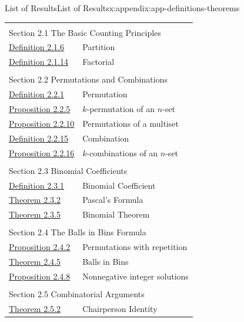 \documentclass[oneside,10pt,]{book}
\numberwithin{equation}{section}
\begin{document}
\begin{appendixptx}{List of Results}{}{List of Results}{}{}{x:appendix:app-definitions-theorems}
\begin{longtable}[l]{ll}
\multicolumn{2}{l}{\null}\\[1.5ex] \multicolumn{2}{l}{\large Section 2.1 The Basic Counting Principles}\\[0.5ex]
\hyperref[x:definition:def-partition]{Definition 2.1.6}& Partition\\
\hyperref[x:definition:def-factorial]{Definition 2.1.14}& Factorial\\
\multicolumn{2}{l}{\null}\\[1.5ex] \multicolumn{2}{l}{\large Section 2.2 Permutations and Combinations}\\[0.5ex]
\hyperref[x:definition:def-permutation]{Definition 2.2.1}& Permutation\\
\hyperref[x:proposition:prop-Pnk]{Proposition 2.2.5}& \(k\)-permutation of an \(n\)-set\\
\hyperref[x:proposition:prop-perm-repeat]{Proposition 2.2.10}& Permutations of a multiset\\
\hyperref[x:definition:def-combination]{Definition 2.2.15}& Combination\\
\hyperref[x:proposition:prop-comb]{Proposition 2.2.16}& \(k\)-combinations of an \(n\)-set\\
\multicolumn{2}{l}{\null}\\[1.5ex] \multicolumn{2}{l}{\large Section 2.3 Binomial Coefficients}\\[0.5ex]
\hyperref[x:definition:def-binomial-coefficient]{Definition 2.3.1}& Binomial Coefficient\\
\hyperref[x:theorem:thm-pascals-formula]{Theorem 2.3.2}& Pascal's Formula\\
\hyperref[x:theorem:thm-binomial]{Theorem 2.3.5}& Binomial Theorem\\
\multicolumn{2}{l}{\null}\\[1.5ex] \multicolumn{2}{l}{\large Section 2.4 The Balls in Bins Formula}\\[0.5ex]
\hyperref[x:proposition:prop-perm-repetition]{Proposition 2.4.2}& Permutations with repetition\\
\hyperref[x:theorem:thm-comb-replace]{Theorem 2.4.5}& Balls in Bins\\
\hyperref[x:proposition:prop-nonnegative]{Proposition 2.4.8}& Nonnegative integer solutions\\
\multicolumn{2}{l}{\null}\\[1.5ex] \multicolumn{2}{l}{\large Section 2.5 Combinatorial Arguments}\\[0.5ex]
\hyperref[x:theorem:thm-chairperson]{Theorem 2.5.2}& Chairperson Identity\\

\end{longtable}
\end{appendixptx}
\end{document}
